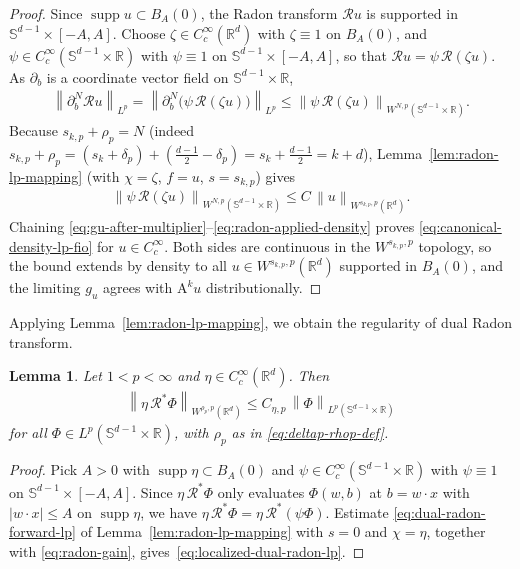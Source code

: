 \documentclass[12pt]{article}
\numberwithin{equation}{section}
\newtheorem{lemma}{Lemma}[section]
\numberwithin{figure}{section}
\numberwithin{equation}{section}
\newcommand{\R}{\mathbb{R}}
\newcommand{\Sph}{\mathbb S}
\newcommand{\norm}[1]{\left\|#1\right\|}
\newcommand{\abs}[1]{\left|#1\right|}
\DeclareMathOperator{\supp}{supp}
\begin{document}
\begin{proof}
Since $\supp u\subset B_A(0)$, the Radon transform $\mathcal Ru$ is supported in
$\Sph^{d-1}\times[-A,A]$. Choose $\zeta\in C_c^\infty(\R^d)$ with $\zeta\equiv1$
on $B_A(0)$, and $\psi\in C_c^\infty(\Sph^{d-1}\times\R)$ with $\psi\equiv1$ on
$\Sph^{d-1}\times[-A,A]$, so that $\mathcal Ru=\psi\,\mathcal R(\zeta u)$. As
$\partial_b$ is a coordinate vector field on $\Sph^{d-1}\times\R$,
\begin{align*}
    \norm{\partial_b^N\mathcal Ru}_{L^p}
    =\norm{\partial_b^N\bigl(\psi\,\mathcal R(\zeta u)\bigr)}_{L^p}
    \le\norm{\psi\,\mathcal R(\zeta u)}_{W^{N,p}(\Sph^{d-1}\times\R)} .
\end{align*}
Because $s_{k,p}+\rho_p=N$ (indeed
$s_{k,p}+\rho_p=(s_k+\delta_p)+(\tfrac{d-1}{2}-\delta_p)=s_k+\tfrac{d-1}{2}=k+d$),
Lemma~\ref{lem:radon-lp-mapping} (with $\chi=\zeta$, $f=u$, $s=s_{k,p}$) gives
\begin{align}
    \norm{\psi\,\mathcal R(\zeta u)}_{W^{N,p}(\Sph^{d-1}\times\R)}
    \le C\,\norm{u}_{W^{s_{k,p},p}(\R^d)} .
    \label{eq:radon-applied-density}
\end{align}
Chaining \eqref{eq:gu-after-multiplier}--\eqref{eq:radon-applied-density} proves
\eqref{eq:canonical-density-lp-fio} for $u\in C_c^\infty$. Both sides are
continuous in the $W^{s_{k,p},p}$ topology, so the bound extends by density to all
$u\in W^{s_{k,p},p}(\R^d)$ supported in $B_A(0)$, and the limiting $g_u$ agrees
with $\mathrm{A}^k u$ distributionally.
\end{proof}
Applying Lemma~\ref{lem:radon-lp-mapping}, we obtain the regularity of dual Radon transform.
\begin{lemma}
\label{lem:localized-dual-radon-lp}
Let $1<p<\infty$ and $\eta\in C_c^\infty(\R^d)$. Then
\begin{align}
    \norm{\eta\,\mathcal R^*\Phi}_{W^{\rho_p,p}(\R^d)}
    \le C_{\eta,p}\,\norm{\Phi}_{L^p(\Sph^{d-1}\times\R)}
    \label{eq:localized-dual-radon-lp}
\end{align}
for all $\Phi\in L^p(\Sph^{d-1}\times\R)$, with $\rho_p$ as in
\eqref{eq:deltap-rhop-def}.
\end{lemma}

\begin{proof}
Pick $A>0$ with $\supp\eta\subset B_A(0)$ and $\psi\in C_c^\infty(\Sph^{d-1}\times
\R)$ with $\psi\equiv1$ on $\Sph^{d-1}\times[-A,A]$. Since $\eta\,\mathcal
R^*\Phi$ only evaluates $\Phi(w,b)$ at $b=w\cdot x$ with $\abs{w\cdot x}\le A$ on
$\supp\eta$, we have $\eta\,\mathcal R^*\Phi=\eta\,\mathcal R^*(\psi\Phi)$.
Estimate \eqref{eq:dual-radon-forward-lp} of Lemma~\ref{lem:radon-lp-mapping} with
$s=0$ and $\chi=\eta$, together with \eqref{eq:radon-gain},
gives~\eqref{eq:localized-dual-radon-lp}.
\end{proof}
\end{document}

